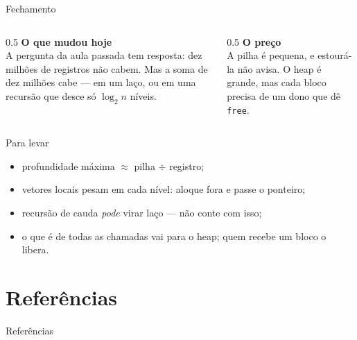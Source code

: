 \documentclass[aspectratio=169]{beamer}
\begin{document}
\begin{frame}{Fechamento}
  \begin{columns}[T]
    \begin{column}{0.5\textwidth}
      \textbf{O que mudou hoje}\\[0.3em]
      \small A pergunta da aula passada tem resposta: dez milhões de
      registros não cabem. Mas a soma de dez milhões cabe --- em um laço, ou
      em uma recursão que desce só $\log_2 n$ níveis.
    \end{column}
    \begin{column}{0.5\textwidth}
      \textbf{O preço}\\[0.3em]
      \small A pilha é pequena, e estourá-la não avisa. O heap é grande, mas
      cada bloco precisa de um dono que dê \texttt{free}.
    \end{column}
  \end{columns}
  \begin{block}{Para levar}
    \begin{itemize}
      \small
      \item profundidade máxima $\approx$ pilha $\div$ registro;
      \item vetores locais pesam em cada nível: aloque fora e passe o
        ponteiro;
      \item recursão de cauda \emph{pode} virar laço --- não conte com isso;
      \item o que é de todas as chamadas vai para o heap; quem recebe um
        bloco o libera.
    \end{itemize}
  \end{block}
\end{frame}

\section*{Referências}
\begin{frame}[allowframebreaks]{Referências}
  \nocite{*}
  
  
\end{frame}
\end{document}

